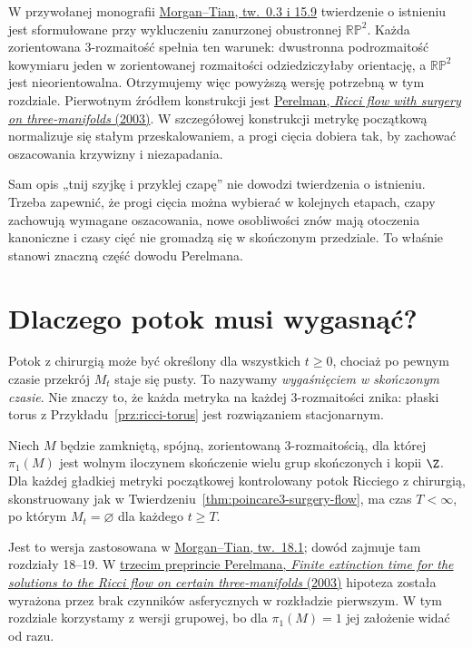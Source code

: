 W przywołanej monografii
\href{https://www.claymath.org/library/monographs/cmim03.pdf}
{Morgan--Tian, tw.\ 0.3 i 15.9}
twierdzenie o istnieniu jest sformułowane
przy wykluczeniu zanurzonej obustronnej
$\mathbb{RP}^2$. Każda zorientowana
$3$-rozmaitość spełnia ten warunek:
dwustronna podrozmaitość kowymiaru jeden
w zorientowanej rozmaitości odziedziczyłaby
orientację, a $\mathbb{RP}^2$ jest
nieorientowalna. Otrzymujemy więc powyższą
wersję potrzebną w tym rozdziale.
Pierwotnym źródłem konstrukcji jest
\href{https://arxiv.org/pdf/math/0303109}
{Perelman, \emph{Ricci flow with surgery on
three-manifolds} (2003)}.
W szczegółowej konstrukcji metrykę początkową
normalizuje się stałym przeskalowaniem,
a progi cięcia dobiera tak, by zachować
oszacowania krzywizny i niezapadania.

Sam opis „tnij szyjkę i przyklej czapę”
nie dowodzi twierdzenia o istnieniu.
Trzeba zapewnić, że progi cięcia można
wybierać w kolejnych etapach, czapy
zachowują wymagane oszacowania,
nowe osobliwości znów mają otoczenia
kanoniczne i czasy cięć nie gromadzą się
w skończonym przedziale. To właśnie
stanowi znaczną część dowodu Perelmana.

\section{Dlaczego potok musi wygasnąć?}
\label{sec:poincare3-wygasanie}

Potok z chirurgią może być określony dla
wszystkich $t\geq0$, chociaż po pewnym
czasie przekrój $M_t$ staje się pusty.
To nazywamy \emph{wygaśnięciem w skończonym
czasie}. Nie znaczy to, że każda metryka
na każdej $3$-rozmaitości znika:
płaski torus z Przykładu~\ref{prz:ricci-torus}
jest rozwiązaniem stacjonarnym.

\begin{twierdzenie}
\label{thm:poincare3-extinction}
Niech $M$ będzie zamkniętą, spójną,
zorientowaną $3$-rozmaitością, dla której
$\pi_1(M)$ jest wolnym iloczynem skończenie
wielu grup skończonych i kopii $\Z$.
Dla każdej gładkiej metryki początkowej
kontrolowany potok Ricciego z chirurgią,
skonstruowany jak w
Twierdzeniu~\ref{thm:poincare3-surgery-flow},
ma czas $T<\infty$, po którym $M_t=\varnothing$
dla każdego $t\geq T$.
\end{twierdzenie}

Jest to wersja zastosowana w
\href{https://www.claymath.org/library/monographs/cmim03.pdf}
{Morgan--Tian, tw.\ 18.1}; dowód zajmuje
tam rozdziały 18--19. W
\href{https://arxiv.org/pdf/math/0307245}
{trzecim preprincie Perelmana,
\emph{Finite extinction time for the solutions
to the Ricci flow on certain three-manifolds}
(2003)} hipoteza została wyrażona przez brak
czynników asferycznych w rozkładzie pierwszym.
W tym rozdziale korzystamy z wersji grupowej,
bo dla $\pi_1(M)=1$ jej założenie widać od razu.

